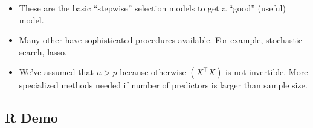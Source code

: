 \begin{itemize}
      \item These are the basic ``stepwise'' selection models to get
            a ``good'' (useful) model.
      \item Many other have sophisticated procedures available.
            For example, stochastic search, lasso.
      \item We've assumed that $ n>p $ because otherwise
            $ (X^\top X) $ is not invertible. More specialized
            methods needed if number of predictors is larger than sample size.
\end{itemize}
\subsection{R Demo}

